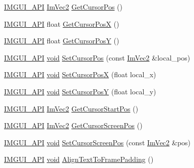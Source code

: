 \begin{DoxyCompactItemize}
\item 
\hyperlink{imgui_8h_a43829975e84e45d1149597467a14bbf5}{I\+M\+G\+U\+I\+\_\+\+A\+PI} \hyperlink{structImVec2}{Im\+Vec2} \hyperlink{namespaceImGui_a2fa4eb57e0f73b90e8edcd226a0cc7d5}{Get\+Cursor\+Pos} ()
\item 
\hyperlink{imgui_8h_a43829975e84e45d1149597467a14bbf5}{I\+M\+G\+U\+I\+\_\+\+A\+PI} float \hyperlink{namespaceImGui_a022e32c808ac899e25847f4d65633b77}{Get\+Cursor\+PosX} ()
\item 
\hyperlink{imgui_8h_a43829975e84e45d1149597467a14bbf5}{I\+M\+G\+U\+I\+\_\+\+A\+PI} float \hyperlink{namespaceImGui_a86e409551f256b542166989c558d41c1}{Get\+Cursor\+PosY} ()
\item 
\hyperlink{imgui_8h_a43829975e84e45d1149597467a14bbf5}{I\+M\+G\+U\+I\+\_\+\+A\+PI} \hyperlink{imgui__impl__opengl3__loader_8h_ac668e7cffd9e2e9cfee428b9b2f34fa7}{void} \hyperlink{namespaceImGui_a51ea13c986360d8a2e868dc9eeac2115}{Set\+Cursor\+Pos} (const \hyperlink{structImVec2}{Im\+Vec2} \&local\+\_\+pos)
\item 
\hyperlink{imgui_8h_a43829975e84e45d1149597467a14bbf5}{I\+M\+G\+U\+I\+\_\+\+A\+PI} \hyperlink{imgui__impl__opengl3__loader_8h_ac668e7cffd9e2e9cfee428b9b2f34fa7}{void} \hyperlink{namespaceImGui_ae5e6e80ef23bb8df9cd5ac273be8aeb0}{Set\+Cursor\+PosX} (float local\+\_\+x)
\item 
\hyperlink{imgui_8h_a43829975e84e45d1149597467a14bbf5}{I\+M\+G\+U\+I\+\_\+\+A\+PI} \hyperlink{imgui__impl__opengl3__loader_8h_ac668e7cffd9e2e9cfee428b9b2f34fa7}{void} \hyperlink{namespaceImGui_a0037515d9bd7a28cc27a6e40401c1dec}{Set\+Cursor\+PosY} (float local\+\_\+y)
\item 
\hyperlink{imgui_8h_a43829975e84e45d1149597467a14bbf5}{I\+M\+G\+U\+I\+\_\+\+A\+PI} \hyperlink{structImVec2}{Im\+Vec2} \hyperlink{namespaceImGui_a8ee9647de3b39fc7b77395082fc9e0cc}{Get\+Cursor\+Start\+Pos} ()
\item 
\hyperlink{imgui_8h_a43829975e84e45d1149597467a14bbf5}{I\+M\+G\+U\+I\+\_\+\+A\+PI} \hyperlink{structImVec2}{Im\+Vec2} \hyperlink{namespaceImGui_adb0db3c1ee36f5085f35890a4229ae75}{Get\+Cursor\+Screen\+Pos} ()
\item 
\hyperlink{imgui_8h_a43829975e84e45d1149597467a14bbf5}{I\+M\+G\+U\+I\+\_\+\+A\+PI} \hyperlink{imgui__impl__opengl3__loader_8h_ac668e7cffd9e2e9cfee428b9b2f34fa7}{void} \hyperlink{namespaceImGui_a632bc7e15b8258f95ab0bc9b2efd5537}{Set\+Cursor\+Screen\+Pos} (const \hyperlink{structImVec2}{Im\+Vec2} \&pos)
\item 
\hyperlink{imgui_8h_a43829975e84e45d1149597467a14bbf5}{I\+M\+G\+U\+I\+\_\+\+A\+PI} \hyperlink{imgui__impl__opengl3__loader_8h_ac668e7cffd9e2e9cfee428b9b2f34fa7}{void} \hyperlink{namespaceImGui_ae14be3a3bec106de7c91aaa2a9a558a1}{Align\+Text\+To\+Frame\+Padding} ()

\end{DoxyCompactItemize}
